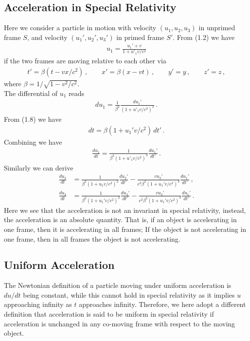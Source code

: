 \documentclass[11pt, onesided]{book}
\theoremstyle{break}
\theoremstyle{break}
\begin{document}
\subsection{Acceleration in Special Relativity}
Here we consider a particle in motion with velocity $(u_1,u_2,u_3)$ in unprimed frame $S$, and velocity $(u_1', u_2', u_3')$ in primed frame $S'$. From (1.2) we have
\begin{align*}
u_1 = \frac{u_1' + v}{1+ u'_1 v/c^2}
\end{align*}
if the two frames are moving relative to each other via
\begin{align*}
t' = \beta(t-vx/c^2)\,, \qquad x' = \beta (x- vt)\,, \qquad y'=y\,, \qquad z'=z\,,
\end{align*}
where $\beta = 1/\sqrt{1-v^2/c^2}$.\\

The differential of $u_1$ reads
\begin{align*}
du_1 = \frac{1}{\beta^2} \frac{du_1'}{(1+u'_1 v/c^2)^2}\,.
\end{align*}
From (1.8) we have
\begin{align*}
dt = \beta (1 + u_1'v/c^2)\, dt'\,.
\end{align*}
Combining we have
\begin{align*}
\frac{du_1}{dt} = \frac{1}{\beta^3(1+ u'_1 v/c^2)^3}\frac{du_1'}{dt'}\,.
\end{align*}
Similarly we can derive
\begin{align*}
\frac{du_2}{dt} &= \frac{1}{\beta^2(1+u_1v/c^2)^2} \frac{du_2'}{dt'} - \frac{vu_2'}{c^2 \beta^2 ( 1+ u_1'v/c^2)^3}\frac{du_1'}{dt'}\,,\\
\frac{du_3}{dt} &= \frac{1}{\beta^2(1+u_1'v/c^2)^2}\frac{du_3'}{dt'} - \frac{vu_3'}{c^2 \beta^2 (1+ u_1'v/c^2)^3}\frac{du_1'}{dt'}\,.
\end{align*}
Here we see that the acceleration is not an invariant in special relativity, instead, the acceleration is an absolute quantity. That is, if an object is accelerating in one frame, then it is accelerating in all frames; If the object is not accelerating in one frame, then in all frames the object is not accelerating. \\

\subsection{Uniform Acceleration}
The Newtonian definition of a particle moving under uniform acceleration is $du/dt$ being constant, while this cannot hold in special relativity as it implies $u$ approaching infinity as $t$ approaches infinity. Therefore, we here adopt a different definition that acceleration is said to be uniform in special relativity if acceleration is unchanged in any co-moving frame with respect to the moving object. \\
\end{document}
